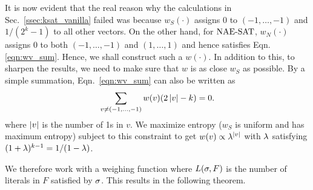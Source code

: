 \documentclass[letterpaper, 10pt, twocolumn, reqno]{amsart}
\begin{document}
It is now evident that the real reason why the calculations in Sec.~\ref{ssec:ksat_vanilla} failed was because $w_S(\cdot)$ assigns 0 to $(-1,\ldots,-1)$
and $1/(2^k-1)$ to all other vectors. On the other hand, for $\textrm{NAE-SAT}$, $w_N(\cdot)$ assigns 0 to both $(-1,\ldots,-1)$ and $(1,\ldots,1)$ and hence satisfies Eqn.~
\eqref{eqn:wv_sum}. Hence, we shall construct such a $w(\cdot)$. In addition to this, to sharpen the results, we need to make sure that $w$ is as close $w_S
$ as possible. By a simple summation, Eqn.~\eqref{eqn:wv_sum} can also be written as
$$
\sum_{v \neq (-1,\ldots,-1)} w(v) (2\left| v \right| - k) = 0.
$$
where $\left| v \right|$ is the number of 1s in $v$. We maximize entropy ($w_S$ is uniform and has maximum entropy) subject to this constraint to get $w(v) \propto \lambda^{\left| v \right|}$ with $\lambda$ satisfying $(1+\lambda)^{k-1} = 1/(1-\lambda)$.

We therefore work with a weighing function
where $L(\sigma,F)$ is the number of literals in $F$ satisfied by $\sigma$. This results in the following theorem.
\end{document}
